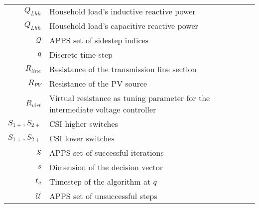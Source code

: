 \begin{scriptsize}
\begin{tabularx}{\textwidth}{r|X}
$Q_{Lhh}$                       & Household load's inductive reactive power\\
$Q_{Lhh}$                       & Household load's capacitive reactive power\\
$\mathcal{Q}$                   & APPS set of sidestep indices\\
$q$																& Discrete time step\\
$R_{line}$                    & Resistance of the transmission line section\\
$R_{PV}$                    & Resistance of the PV source\\
$R_{virt}$                    & Virtual resistance as tuning parameter for the intermediate voltage controller\\
$S_{1+},S_{2+}$										& CSI higher switches\\
$S_{1+},S_{2+}$										& CSI lower switches\\
$\mathcal{S}$                   & APPS set of successful iterations\\
$s$                             & Dimension of the decision vector\\
$t_q$                             & Timestep of the algorithm at $q$\\
$\mathcal{U}$              & APPS set of unsuccessful steps\\

\end{tabularx}
\end{scriptsize}
